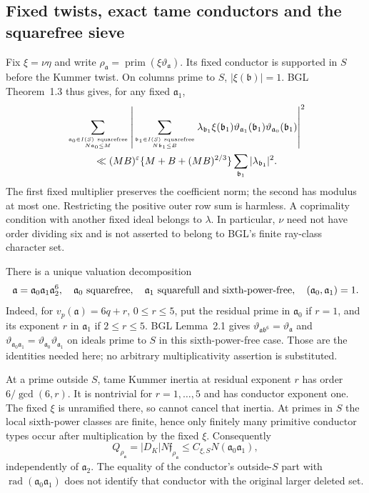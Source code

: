 \documentclass[11pt]{article}
\theoremstyle{definition}\newtheorem{definition}[theorem]{Definition}
\theoremstyle{remark}\newtheorem{remark}[theorem]{Remark}
\begin{document}
\subsection{Fixed twists, exact tame conductors and the squarefree sieve}
Fix $\xi=\nu\eta$ and write
$\rho_{\mathfrak a}=\operatorname{prim}
(\xi\vartheta_{\mathfrak a})$. Its fixed conductor is supported in
$S$ before the Kummer twist. On columns prime to $S$, $|\xi(\mathfrak b)|=1$.
BGL Theorem~1.3 thus gives, for any fixed $\mathfrak a_1$,
\begin{align}\label{mm:ls}
 &\sum_{\mathfrak a_0\in I(S)\ \mathrm{squarefree}\atop N\mathfrak a_0\le M}
 \left|\sum_{\mathfrak b_1\in I(S)\ \mathrm{squarefree}\atop N\mathfrak b_1\le B}
 \lambda_{\mathfrak b_1}\xi(\mathfrak b_1)
 \vartheta_{\mathfrak a_1}(\mathfrak b_1)
 \vartheta_{\mathfrak a_0}(\mathfrak b_1)\right|^2\notag\\
 &\hspace{1cm}\ll (MB)^\varepsilon
 \{M+B+(MB)^{2/3}\}\sum_{\mathfrak b_1}|\lambda_{\mathfrak b_1}|^2.
\end{align}
The first fixed multiplier preserves the coefficient norm; the second
has modulus at most one. Restricting the positive outer row sum is
harmless. A coprimality condition with another fixed ideal belongs to
$\lambda$. In particular, $\nu$ need not have order dividing six and
is not asserted to belong to BGL's finite ray-class character set.

There is a unique valuation decomposition
\[
 \mathfrak a=\mathfrak a_0\mathfrak a_1\mathfrak a_2^6,
 \quad \mathfrak a_0\ \hbox{squarefree},\quad
 \mathfrak a_1\ \hbox{squarefull and sixth-power-free},\quad
 (\mathfrak a_0,\mathfrak a_1)=1.
\]
Indeed, for $v_p(\mathfrak a)=6q+r$, $0\le r\le5$, put the residual
prime in $\mathfrak a_0$ if $r=1$, and its exponent $r$ in
$\mathfrak a_1$ if $2\le r\le5$. BGL Lemma~2.1 gives
$\vartheta_{\mathfrak a\mathfrak b^6}=\vartheta_{\mathfrak a}$ and
$\vartheta_{\mathfrak a_0\mathfrak a_1}
=\vartheta_{\mathfrak a_0}\vartheta_{\mathfrak a_1}$ on ideals
prime to $S$ in this sixth-power-free case. Those are the identities
needed here; no arbitrary multiplicativity assertion is substituted.

At a prime outside $S$, tame Kummer inertia at residual exponent $r$
has order $6/\gcd(6,r)$. It is nontrivial for $r=1,\ldots,5$ and
has conductor exponent one. The fixed $\xi$ is unramified there, so
cannot cancel that inertia. At primes in $S$ the local sixth-power
classes are finite, hence only finitely many primitive conductor types
occur after multiplication by the fixed $\xi$. Consequently
\begin{equation}\label{mm:conductor}
 Q_{\rho_{\mathfrak a}}=|D_K|N\mathfrak f_{\rho_{\mathfrak a}}
 \le C_{\xi,S}N(\mathfrak a_0\mathfrak a_1),
\end{equation}
independently of $\mathfrak a_2$. The equality of the conductor's
outside-$S$ part with $\operatorname{rad}(\mathfrak a_0\mathfrak a_1)$
does not identify that conductor with the original larger deleted set.
\end{document}
